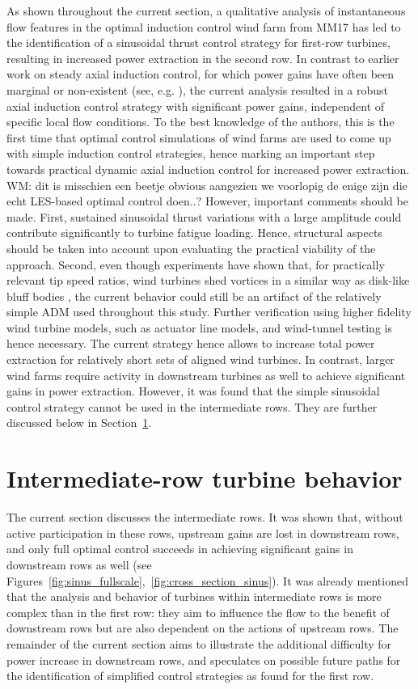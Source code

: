 \documentclass[wes, manuscript]{copernicus}
\newcommand{\red}[1]{{\color{red} #1}}
\begin{document}
As shown throughout the current section, a qualitative analysis of instantaneous flow features in the optimal induction control wind farm from MM17 has led to the identification of a sinusoidal thrust control strategy for first-row turbines, resulting in increased power extraction in the second row. In contrast to earlier work on steady axial induction control, for which power gains have often been marginal or non-existent (see, e.g. \citealp{annoni2016analysis}), the current analysis resulted in a robust axial induction control strategy with significant power gains, independent of specific local flow conditions. \red{To the best knowledge of the authors, this is the first time that optimal control simulations of wind farms are used to come up with simple induction control strategies, hence marking an important step towards practical dynamic axial induction control for increased power extraction. WM: dit is misschien een beetje obvious aangezien we voorlopig de enige zijn die echt LES-based optimal control doen..?} However, important comments should be made. First, sustained sinusoidal thrust variations with a large amplitude could contribute significantly to turbine fatigue loading. Hence, structural aspects should be taken into account upon evaluating the practical viability of the approach. Second, even though experiments have shown that, for practically relevant tip speed ratios, wind turbines shed vortices in a similar way as disk-like bluff bodies \citep{medici2006measurements}, the current behavior could still be an artifact of the relatively simple ADM used throughout this study. Further verification using higher fidelity wind turbine models, such as actuator line models, and wind-tunnel testing is hence necessary. The current strategy hence allows to increase total power extraction for relatively short sets of aligned wind turbines. In contrast, larger wind farms require activity in downstream turbines as well to achieve significant gains in power extraction. However, it was found that the simple sinusoidal control strategy cannot be used in the intermediate rows. They are further discussed below in Section~\ref{sec:analysis_intermediate}.

\section{Intermediate-row turbine behavior}\label{sec:analysis_intermediate}
The current section discusses the intermediate rows. It was shown that, without active participation in these rows, upstream gains are lost in downstream rows, and only full optimal control succeeds in achieving significant gains in downstream rows as well (see Figures~\ref{fig:sinus_fullscale},~\ref{fig:cross_section_sinus}). It was already mentioned that the analysis and behavior of turbines within intermediate rows is more complex than in the first row: they aim to influence the flow to the benefit of downstream rows but are also dependent on the actions of upstream rows. The remainder of the current section aims to illustrate the additional difficulty for power increase in downstream rows, and speculates on possible future paths for the identification of simplified control strategies as found for the first row.
\end{document}
